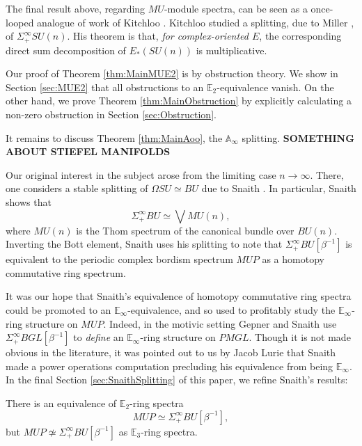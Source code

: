 The final result above, regarding $MU$-module spectra, can be seen as a once-looped analogue of work of Kitchloo \cite{Kitchloo}.   Kitchloo studied a splitting, due to Miller \cite{MillerSplitting}, of $\Sigma^{\infty}_+ SU(n)$.  His theorem is that, \textit{for complex-oriented $E$}, the corresponding direct sum decomposition of $E_*(SU(n))$ is multiplicative.

Our proof of Theorem \ref{thm:MainMUE2} is by obstruction theory.  We show in Section \ref{sec:MUE2} that all obstructions to an $\mathbb{E}_2$-equivalence vanish.  On the other hand, we prove Theorem \ref{thm:MainObstruction} by explicitly calculating a non-zero obstruction in Section \ref{sec:Obstruction}.

It remains to discuss Theorem \ref{thm:MainAoo}, the $\mathbb{A}_\infty$ splitting.
\textbf{SOMETHING ABOUT STIEFEL MANIFOLDS}

Our original interest in the subject arose from the limiting case $n \rightarrow \infty$.  There, one considers a stable splitting of $\Omega SU \simeq BU$ due to Snaith \cite{SnaithBook}.  In particular, Snaith shows that
$$\Sigma^{\infty}_+ BU \simeq \bigvee MU(n),$$
where $MU(n)$ is the Thom spectrum of the canonical bundle over $BU(n)$.  Inverting the Bott element, Snaith uses his splitting to note that $\Sigma^{\infty}_+ BU [\beta^{-1}]$ is equivalent to the periodic complex bordism spectrum $MUP$ as a homotopy commutative ring spectrum.

It was our hope that Snaith's equivalence of homotopy commutative ring spectra could be promoted to an $\mathbb{E}_\infty$-equivalence, and so used to profitably study the $\mathbb{E}_\infty$-ring structure on $MUP$.  Indeed, in the motivic setting Gepner and Snaith \cite{GepnerSnaith} use $\Sigma^{\infty}_+ BGL[\beta^{-1}]$ to \textit{define} an $\mathbb{E}_\infty$-ring structure on $PMGL$.  Though it is not made obvious in the literature, it was pointed out to us by Jacob Lurie that Snaith \cite{SnaithNotMultiplicative} made a power operations computation precluding his equivalence from being $\mathbb{E}_\infty$.  In the final Section \ref{sec:SnaithSplitting} of this paper, we refine Snaith's results:

\begin{thm}
There is an equivalence of $\mathbb{E}_2$-ring spectra
$$MUP \simeq \Sigma^{\infty}_+ BU[\beta^{-1}],$$
but $MUP \not \simeq \Sigma^{\infty}_+ BU[\beta^{-1}]$ as $\mathbb{E}_3$-ring spectra.
\end{thm}

